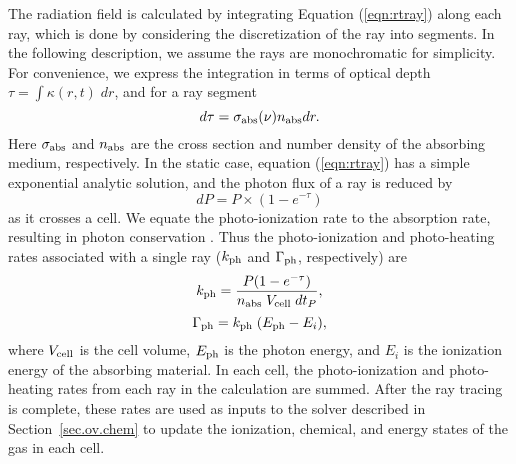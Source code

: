 The radiation field is calculated by integrating Equation
(\ref{eqn:rtray}) along each ray, which is done by considering the
discretization of the ray into segments.  In the following
description, we assume the rays are monochromatic for simplicity.  For
convenience, we express the integration in terms of optical depth
$\tau = \int \kappa(r,t) \; dr$, and for a ray segment
%
\begin{equation}
  \label{eqn:dtau}
  d\tau = \sigma_{\rm abs}(\nu) n_{\rm abs} dr.
\end{equation}
Here $\sigma_{\rm abs}$ and $n_{\rm abs}$ are the cross section and
number density of the absorbing medium, respectively.  In the static
case, equation (\ref{eqn:rtray}) has a simple exponential analytic
solution, and the photon flux of a ray is reduced by
%
\begin{equation}
  \label{eqn:flux}
  dP = P \times (1 - e^{-\tau})
\end{equation}
as it crosses a cell.  We equate the photo-ionization rate to the
absorption rate, resulting in photon conservation \citep{Abel99_RT,
  Mellema06}.  Thus the photo-ionization and
photo-heating rates associated with a single ray ($k_{\rm ph}$ and
$\Gamma_{\rm ph}$, respectively)  are
%
\begin{equation}
  \label{eqn:kph}
  k_{\rm ph} = \frac{P (1 - e^{-\tau})}{n_{\rm abs} \; V_{\rm cell} \; dt_P},
\end{equation}
\begin{equation}
  \label{eqn:gamma}
  \Gamma_{\rm ph} = k_{\rm ph} \; (E_{\rm ph} - E_i),
\end{equation}
where $V_{\rm cell}$ is the cell volume, $E_{\rm ph}$ is the photon
energy, and $E_i$ is the ionization energy of the absorbing material.
In each cell, the photo-ionization and photo-heating rates from each
ray in the calculation are summed. After the ray tracing is
complete, these rates are used as inputs to the solver described in
Section~\ref{sec.ov.chem} to update the ionization, chemical, and energy states
of the gas in each cell.

